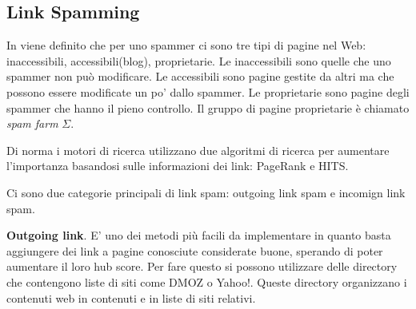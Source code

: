 \subsection{Link Spamming}
In \cite{ilprints646} viene definito che per uno spammer ci sono tre tipi di pagine nel Web: inaccessibili, accessibili(blog), proprietarie. Le inaccessibili sono quelle che uno spammer non può modificare. Le accessibili sono pagine gestite da altri ma che possono essere modificate un po' dallo spammer. Le proprietarie sono pagine degli spammer che hanno il pieno controllo. Il gruppo di pagine proprietarie è chiamato \textit{spam farm} \begin{math} \Sigma \end{math}.

Di norma i motori di ricerca utilizzano due algoritmi di ricerca per aumentare l'importanza basandosi sulle informazioni dei link: PageRank e HITS. %

Ci sono due categorie principali di link spam: outgoing link spam e incomign link spam.

\textbf{Outgoing link}. E' uno dei metodi più facili da implementare in quanto basta aggiungere dei link a pagine conosciute considerate buone, sperando di poter aumentare il loro hub score. Per fare questo si possono utilizzare delle directory che contengono liste di siti come DMOZ o Yahoo!. Queste directory organizzano i contenuti web in contenuti e in liste di siti relativi.

